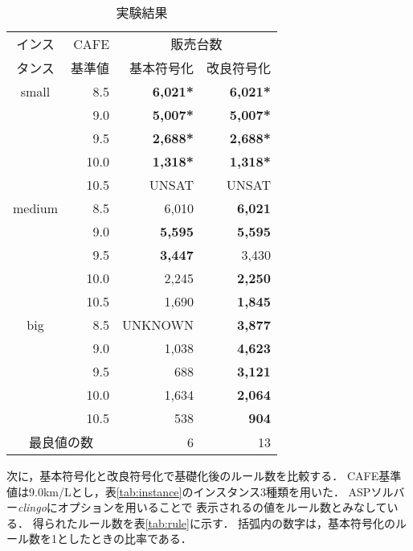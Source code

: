 \begin{table}[tb]
 \caption{実験結果}
 \centering
 \begin{tabular}{c|r|rr} \bhline
  インス & CAFE & \multicolumn{2}{c}{販売台数} \\ \cline{3-4}
  タンス & 基準値 & 基本符号化             & 改良符号化 \\\hline    
  small & 8.5   & \textbf{6,021*}       & \textbf{6,021*}       \\
        & 9.0   & \textbf{5,007*}       & \textbf{5,007*}       \\
        & 9.5   & \textbf{2,688*}       & \textbf{2,688*}       \\
        & 10.0  & \textbf{1,318*}       & \textbf{1,318*}       \\
        & 10.5  & UNSAT                 & UNSAT                 \\ \hline
  medium & 8.5  & 6,010                 & \textbf{6,021}        \\
         & 9.0  & \textbf{5,595}        & \textbf{5,595}        \\
         & 9.5  & \textbf{3,447}        & 3,430                 \\
         & 10.0 & 2,245                 & \textbf{2,250}        \\
         & 10.5 & 1,690                 & \textbf{1,845}        \\ \hline
  big   & 8.5   & UNKNOWN               & \textbf{3,877}        \\
        & 9.0   & 1,038                 & \textbf{4,623}        \\
        & 9.5   & 688                   & \textbf{3,121}        \\
        & 10.0  & 1,634                 & \textbf{2,064}        \\
        & 10.5  & 538                   & \textbf{904}          \\ \hline \hline
  \multicolumn{2}{c}{最良値の数} & 6 & 13                        \\ \hline
 \end{tabular}
 \label{tab:result}
\end{table}

次に，基本符号化と改良符号化で基礎化後のルール数を比較する．
CAFE基準値は9.0km/Lとし，表\ref{tab:instance}のインスタンス3種類を用いた．
ASPソルバー\textit{clingo}にオプションを用いることで
表示されるの値をルール数とみなしている．
得られたルール数を表\ref{tab:rule}に示す．
括弧内の数字は，基本符号化のルール数を1としたときの比率である．

